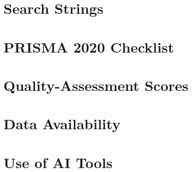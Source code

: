 \documentclass[manuscript,screen]{acmart}
\begin{document}
\section{Search Strings}\label{app:search-strings}


\section{PRISMA 2020 Checklist}\label{app:prisma-checklist}


\section{Quality-Assessment Scores}\label{app:qa-scores}


\section{Data Availability}\label{app:data-availability}


\section{Use of AI Tools}\label{app:ai-use}

\end{document}
